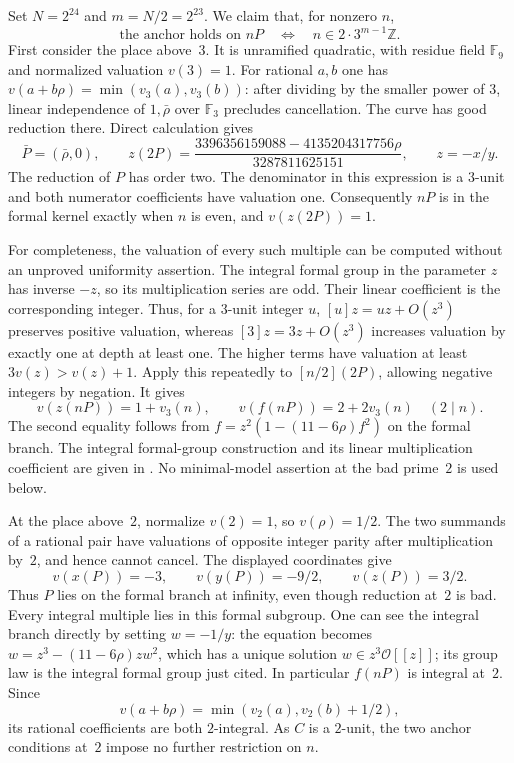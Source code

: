 \documentclass[11pt]{article}
\theoremstyle{definition}
\theoremstyle{remark}
\begin{document}
Set $N=2^{24}$ and $m=N/2=2^{23}$. We claim that, for nonzero $n$,
\[
 \text{the anchor holds on }nP
 \quad\Longleftrightarrow\quad
 n\in 2\cdot3^{m-1}\mathbb Z.
\]
First consider the place above~$3$. It is unramified quadratic, with
residue field $\mathbb F_9$ and normalized valuation $v(3)=1$.
For rational $a,b$ one has
$v(a+b\rho)=\min(v_3(a),v_3(b))$: after dividing by the smaller
power of $3$, linear independence of $1,\bar\rho$ over $\mathbb F_3$
precludes cancellation.
The curve has good reduction there. Direct calculation gives
\[
 \bar P=(\bar\rho,0),\qquad
 z(2P)=
 \frac{3396356159088-4135204317756\rho}{3287811625151},
 \qquad z=-x/y.
\]
The reduction of $P$ has order two. The denominator in this expression
is a $3$-unit and both numerator coefficients have valuation one.
Consequently $nP$ is in the formal kernel exactly when $n$ is even,
and $v(z(2P))=1$.

For completeness, the valuation of every such multiple can be computed
without an unproved uniformity assertion. The integral formal group
in the parameter $z$ has inverse $-z$, so its multiplication series
are odd. Their linear coefficient is the corresponding integer.
Thus, for a $3$-unit integer $u$, $[u]z=uz+O(z^3)$ preserves positive
valuation, whereas $[3]z=3z+O(z^3)$ increases valuation by exactly one
at depth at least one. The higher terms have valuation at least
$3v(z)>v(z)+1$. Apply this repeatedly to $[n/2](2P)$, allowing
negative integers by negation. It gives
\[
 v(z(nP))=1+v_3(n),\qquad
 v(f(nP))=2+2v_3(n)\quad(2\mid n).
\]
The second equality follows from
$f=z^2(1-(11-6\rho)f^2)$ on the formal branch.
The integral formal-group construction and its linear multiplication
coefficient are given in \cite[IV\S1, Example~IV.2.2.3 and
Proposition~IV.2.3(a)]{silverman}. No minimal-model assertion at
the bad prime~$2$ is used below.

At the place above~$2$, normalize $v(2)=1$, so $v(\rho)=1/2$.
The two summands of a rational pair have valuations of opposite
integer parity after multiplication by~$2$, and hence cannot cancel.
The displayed coordinates give
\[
 v(x(P))=-3,\qquad v(y(P))=-9/2,\qquad v(z(P))=3/2.
\]
Thus $P$ lies on the formal branch at infinity, even though reduction
at~$2$ is bad. Every integral multiple lies in this formal subgroup.
One can see the integral branch directly by setting $w=-1/y$:
the equation becomes $w=z^3-(11-6\rho)zw^2$, which has a unique
solution $w\in z^3\mathcal O[[z]]$; its group law is the integral
formal group just cited. In particular $f(nP)$ is integral at~$2$.
Since
\[
 v(a+b\rho)=\min(v_2(a),v_2(b)+1/2),
\]
its rational coefficients are both $2$-integral. As $C$ is a $2$-unit,
the two anchor conditions at~$2$ impose no further restriction on $n$.
\end{document}
